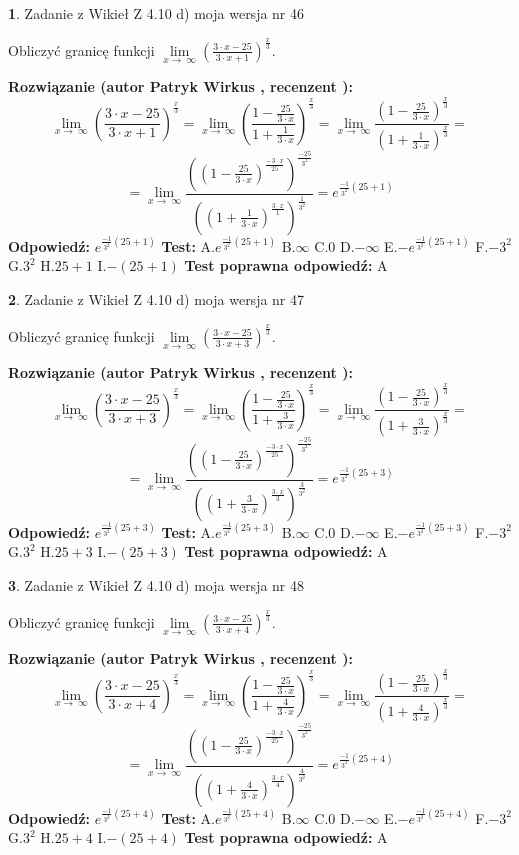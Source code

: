 \documentclass[12pt, a4paper]{article}
\theoremstyle{definition} %
\newtheorem{zad}{}
\newcommand{\zadStart}[1]{\begin{zad}#1\newline}
\newcommand{\zadStop}{\end{zad}}
\newcommand{\rozwStart}[2]{\noindent \textbf{Rozwiązanie (autor #1 , recenzent #2): }\newline}
\newcommand{\rozwStop}{\newline}
\newcommand{\odpStart}{\noindent \textbf{Odpowiedź:}\newline}
\newcommand{\odpStop}{\newline}
\newcommand{\testStart}{\noindent \textbf{Test:}\newline}
\newcommand{\testStop}{\newline}
\newcommand{\kluczStart}{\noindent \textbf{Test poprawna odpowiedź:}\newline}
\newcommand{\kluczStop}{\newline}
\begin{document}
\zadStart{Zadanie z Wikieł Z 4.10 d) moja wersja nr 46}


Obliczyć granicę funkcji  $\lim\limits_{x\to\ \infty}(\frac{3\cdot x-25}{3\cdot x+1})^{\frac{x}{3}}$.
\zadStop
\rozwStart{Patryk Wirkus}{}
$$\lim\limits_{x\to\ \infty}(\frac{3\cdot x-25}{3\cdot x+1})^{\frac{x}{3}} = \lim\limits_{x\to\ \infty}(\frac{1-\frac{25}{3\cdot x}}{1+\frac{1}{3\cdot x}})^{\frac{x}{3}}=\lim\limits_{x\to\ \infty}\frac{(1-\frac{25}{3\cdot x})^{\frac{x}{3}}}{(1+\frac{1}{3\cdot x})^{\frac{x}{3}}}=$$
$$=\lim\limits_{x\to\ \infty}\frac{((1-\frac{25}{3\cdot x})^{\frac{-3\cdot x}{25}})^{\frac{-25}{3^{2}}}}{((1+\frac{1}{3\cdot x})^{\frac{3\cdot x}{1}})^{\frac{1}{3^{2}}}}=e^{\frac{-1}{3^{2}}(25+1)}$$
\rozwStop
\odpStart
$e^{\frac{-1}{3^{2}}(25+1)}$
\odpStop
\testStart
A.$e^{\frac{-1}{3^{2}}(25+1)}$ B.$\infty$ C.$0$ D.$-\infty$ E.$-e^{\frac{-1}{3^{2}}(25+1)}$
F.$-3^{2}$ G.$3^{2}$
H.$25+1$
I.$-(25+1)$
\testStop
\kluczStart
A
\kluczStop



\zadStart{Zadanie z Wikieł Z 4.10 d) moja wersja nr 47}


Obliczyć granicę funkcji  $\lim\limits_{x\to\ \infty}(\frac{3\cdot x-25}{3\cdot x+3})^{\frac{x}{3}}$.
\zadStop
\rozwStart{Patryk Wirkus}{}
$$\lim\limits_{x\to\ \infty}(\frac{3\cdot x-25}{3\cdot x+3})^{\frac{x}{3}} = \lim\limits_{x\to\ \infty}(\frac{1-\frac{25}{3\cdot x}}{1+\frac{3}{3\cdot x}})^{\frac{x}{3}}=\lim\limits_{x\to\ \infty}\frac{(1-\frac{25}{3\cdot x})^{\frac{x}{3}}}{(1+\frac{3}{3\cdot x})^{\frac{x}{3}}}=$$
$$=\lim\limits_{x\to\ \infty}\frac{((1-\frac{25}{3\cdot x})^{\frac{-3\cdot x}{25}})^{\frac{-25}{3^{2}}}}{((1+\frac{3}{3\cdot x})^{\frac{3\cdot x}{3}})^{\frac{3}{3^{2}}}}=e^{\frac{-1}{3^{2}}(25+3)}$$
\rozwStop
\odpStart
$e^{\frac{-1}{3^{2}}(25+3)}$
\odpStop
\testStart
A.$e^{\frac{-1}{3^{2}}(25+3)}$ B.$\infty$ C.$0$ D.$-\infty$ E.$-e^{\frac{-1}{3^{2}}(25+3)}$
F.$-3^{2}$ G.$3^{2}$
H.$25+3$
I.$-(25+3)$
\testStop
\kluczStart
A
\kluczStop



\zadStart{Zadanie z Wikieł Z 4.10 d) moja wersja nr 48}


Obliczyć granicę funkcji  $\lim\limits_{x\to\ \infty}(\frac{3\cdot x-25}{3\cdot x+4})^{\frac{x}{3}}$.
\zadStop
\rozwStart{Patryk Wirkus}{}
$$\lim\limits_{x\to\ \infty}(\frac{3\cdot x-25}{3\cdot x+4})^{\frac{x}{3}} = \lim\limits_{x\to\ \infty}(\frac{1-\frac{25}{3\cdot x}}{1+\frac{4}{3\cdot x}})^{\frac{x}{3}}=\lim\limits_{x\to\ \infty}\frac{(1-\frac{25}{3\cdot x})^{\frac{x}{3}}}{(1+\frac{4}{3\cdot x})^{\frac{x}{3}}}=$$
$$=\lim\limits_{x\to\ \infty}\frac{((1-\frac{25}{3\cdot x})^{\frac{-3\cdot x}{25}})^{\frac{-25}{3^{2}}}}{((1+\frac{4}{3\cdot x})^{\frac{3\cdot x}{4}})^{\frac{4}{3^{2}}}}=e^{\frac{-1}{3^{2}}(25+4)}$$
\rozwStop
\odpStart
$e^{\frac{-1}{3^{2}}(25+4)}$
\odpStop
\testStart
A.$e^{\frac{-1}{3^{2}}(25+4)}$ B.$\infty$ C.$0$ D.$-\infty$ E.$-e^{\frac{-1}{3^{2}}(25+4)}$
F.$-3^{2}$ G.$3^{2}$
H.$25+4$
I.$-(25+4)$
\testStop
\kluczStart
A
\kluczStop
\end{document}
